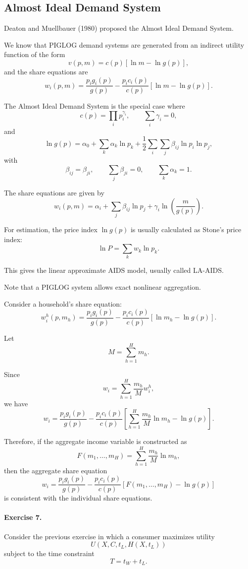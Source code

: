 \subsection{Almost Ideal Demand System}

Deaton and Muellbauer (1980) proposed the Almost Ideal Demand System.

We know that PIGLOG demand systems are generated from an indirect utility function of the form
\[
v(p,m)
=
c(p)
\left[
\ln m-\ln g(p)
\right],
\]
and the share equations are
\[
w_i(p,m)
=
\frac{p_ig_i(p)}{g(p)}
-
\frac{p_ic_i(p)}{c(p)}
\left[
\ln m-\ln g(p)
\right].
\]

The Almost Ideal Demand System is the special case where
\[
c(p)
=
\prod_i p_i^{\gamma_i},
\qquad
\sum_i \gamma_i=0,
\]
and
\[
\ln g(p)
=
\alpha_0
+
\sum_k \alpha_k\ln p_k
+
\frac{1}{2}
\sum_i\sum_j
\beta_{ij}\ln p_i\ln p_j,
\]
with
\[
\beta_{ij}=\beta_{ji},
\qquad
\sum_j\beta_{ji}=0,
\qquad
\sum_k\alpha_k=1.
\]

The share equations are given by
\[
w_i(p,m)
=
\alpha_i
+
\sum_j\beta_{ij}\ln p_j
+
\gamma_i
\ln\left(
\frac{m}{g(p)}
\right).
\]

For estimation, the price index \(\ln g(p)\) is usually calculated as Stone's price index:
\[
\ln P
=
\sum_k w_k\ln p_k.
\]

This gives the linear approximate AIDS model, usually called LA-AIDS.

Note that a PIGLOG system allows exact nonlinear aggregation.

Consider a household's share equation:
\[
w_i^h(p,m_h)
=
\frac{p_ig_i(p)}{g(p)}
-
\frac{p_ic_i(p)}{c(p)}
\left[
\ln m_h-\ln g(p)
\right].
\]

Let
\[
M
=
\sum_{h=1}^H m_h.
\]

Since
\[
w_i
=
\sum_{h=1}^H
\frac{m_h}{M}w_i^h,
\]
we have
\[
w_i
=
\frac{p_ig_i(p)}{g(p)}
-
\frac{p_ic_i(p)}{c(p)}
\left[
\sum_{h=1}^H
\frac{m_h}{M}\ln m_h
-
\ln g(p)
\right].
\]

Therefore, if the aggregate income variable is constructed as
\[
F(m_1,\dots,m_H)
=
\sum_{h=1}^H
\frac{m_h}{M}\ln m_h,
\]
then the aggregate share equation
\[
w_i
=
\frac{p_ig_i(p)}{g(p)}
-
\frac{p_ic_i(p)}{c(p)}
\left[
F(m_1,\dots,m_H)-\ln g(p)
\right]
\]
is consistent with the individual share equations.



\paragraph{Exercise 7.}
Consider the previous exercise in which a consumer maximizes utility
\[
U(X,C,t_L,H(X,t_L))
\]
subject to the time constraint
\[
T=t_W+t_L.
\]

